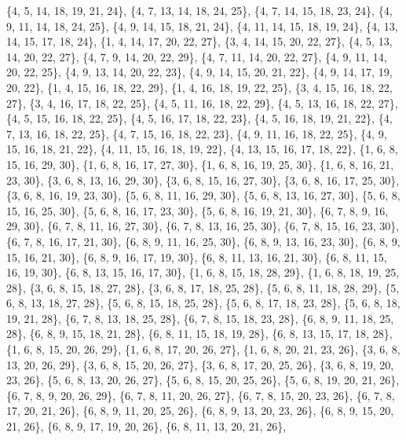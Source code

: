 \documentclass[11pt,a4paper]{article}
\begin{document}
{\{4, 5, 14, 18, 19, 21, 24\}, \{4, 7, 13, 14, 18, 24, 25\}, \{4, 7, 14, 15, 18, 23, 24\}, \{4, 9, 11, 14, 18, 24, 25\}, \{4, 9, 14, 15, 18, 21, 24\},
\{4, 11, 14, 15, 18, 19, 24\}, \{4, 13, 14, 15, 17, 18, 24\}, \{1, 4, 14, 17, 20, 22, 27\}, \{3, 4, 14, 15, 20, 22, 27\}, \{4, 5, 13, 14, 20, 22, 27\},
\{4, 7, 9, 14, 20, 22, 29\}, \{4, 7, 11, 14, 20, 22, 27\}, \{4, 9, 11, 14, 20, 22, 25\}, \{4, 9, 13, 14, 20, 22, 23\}, \{4, 9, 14, 15, 20, 21, 22\},
\{4, 9, 14, 17, 19, 20, 22\}, \{1, 4, 15, 16, 18, 22, 29\}, \{1, 4, 16, 18, 19, 22, 25\}, \{3, 4, 15, 16, 18, 22, 27\}, \{3, 4, 16, 17, 18, 22, 25\},
\{4, 5, 11, 16, 18, 22, 29\}, \{4, 5, 13, 16, 18, 22, 27\}, \{4, 5, 15, 16, 18, 22, 25\}, \{4, 5, 16, 17, 18, 22, 23\}, \{4, 5, 16, 18, 19, 21, 22\},
\{4, 7, 13, 16, 18, 22, 25\}, \{4, 7, 15, 16, 18, 22, 23\}, \{4, 9, 11, 16, 18, 22, 25\}, \{4, 9, 15, 16, 18, 21, 22\}, \{4, 11, 15, 16, 18, 19, 22\},
\{4, 13, 15, 16, 17, 18, 22\}, \{1, 6, 8, 15, 16, 29, 30\}, \{1, 6, 8, 16, 17, 27, 30\}, \{1, 6, 8, 16, 19, 25, 30\}, \{1, 6, 8, 16, 21, 23, 30\},
\{3, 6, 8, 13, 16, 29, 30\}, \{3, 6, 8, 15, 16, 27, 30\}, \{3, 6, 8, 16, 17, 25, 30\}, \{3, 6, 8, 16, 19, 23, 30\}, \{5, 6, 8, 11, 16, 29, 30\},
\{5, 6, 8, 13, 16, 27, 30\}, \{5, 6, 8, 15, 16, 25, 30\}, \{5, 6, 8, 16, 17, 23, 30\}, \{5, 6, 8, 16, 19, 21, 30\}, \{6, 7, 8, 9, 16, 29, 30\},
\{6, 7, 8, 11, 16, 27, 30\}, \{6, 7, 8, 13, 16, 25, 30\}, \{6, 7, 8, 15, 16, 23, 30\}, \{6, 7, 8, 16, 17, 21, 30\}, \{6, 8, 9, 11, 16, 25, 30\},
\{6, 8, 9, 13, 16, 23, 30\}, \{6, 8, 9, 15, 16, 21, 30\}, \{6, 8, 9, 16, 17, 19, 30\}, \{6, 8, 11, 13, 16, 21, 30\}, \{6, 8, 11, 15, 16, 19, 30\},
\{6, 8, 13, 15, 16, 17, 30\}, \{1, 6, 8, 15, 18, 28, 29\}, \{1, 6, 8, 18, 19, 25, 28\}, \{3, 6, 8, 15, 18, 27, 28\}, \{3, 6, 8, 17, 18, 25, 28\},
\{5, 6, 8, 11, 18, 28, 29\}, \{5, 6, 8, 13, 18, 27, 28\}, \{5, 6, 8, 15, 18, 25, 28\}, \{5, 6, 8, 17, 18, 23, 28\}, \{5, 6, 8, 18, 19, 21, 28\},
\{6, 7, 8, 13, 18, 25, 28\}, \{6, 7, 8, 15, 18, 23, 28\}, \{6, 8, 9, 11, 18, 25, 28\}, \{6, 8, 9, 15, 18, 21, 28\}, \{6, 8, 11, 15, 18, 19, 28\},
\{6, 8, 13, 15, 17, 18, 28\}, \{1, 6, 8, 15, 20, 26, 29\}, \{1, 6, 8, 17, 20, 26, 27\}, \{1, 6, 8, 20, 21, 23, 26\}, \{3, 6, 8, 13, 20, 26, 29\},
\{3, 6, 8, 15, 20, 26, 27\}, \{3, 6, 8, 17, 20, 25, 26\}, \{3, 6, 8, 19, 20, 23, 26\}, \{5, 6, 8, 13, 20, 26, 27\}, \{5, 6, 8, 15, 20, 25, 26\},
\{5, 6, 8, 19, 20, 21, 26\}, \{6, 7, 8, 9, 20, 26, 29\}, \{6, 7, 8, 11, 20, 26, 27\}, \{6, 7, 8, 15, 20, 23, 26\}, \{6, 7, 8, 17, 20, 21, 26\},
\{6, 8, 9, 11, 20, 25, 26\}, \{6, 8, 9, 13, 20, 23, 26\}, \{6, 8, 9, 15, 20, 21, 26\}, \{6, 8, 9, 17, 19, 20, 26\}, \{6, 8, 11, 13, 20, 21, 26\},
}
\end{document}
